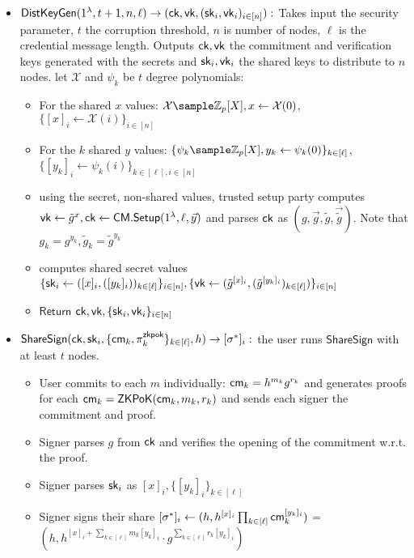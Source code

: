 \begin{itemize}
    \item $\mathsf{DistKeyGen}(1^{\lambda}, t+1, n, \ell) \to (\mathsf{ck}, \mathsf{vk}, (\mathsf{sk}_i, \mathsf{vk}_i)_{i \in [n]}):$ Takes input the security parameter, $t$ the corruption threshold, $n$ is number of nodes, $\ell$ is the credential message length. Outputs $\mathsf{ck}, \mathsf{vk}$ the commitment and verification keys generated with the secrets and $\mathsf{sk}_i, \mathsf{vk}_i$ the shared keys to distribute to $n$ nodes. let $\mathcal{X}$ and $\psi_k $ be $t$ degree polynomials:
    \begin{itemize}
        \item For the shared $x$ values: $\mathcal{X} \sample \Z_p[X], x \gets \mathcal{X}(0)$, $\{[x]_i \gets \mathcal{X}(i)\}_{i\in [n]}$
        \item For the $k$ shared $y$ values: $\{\psi_k \sample \Z_p[X], y_k \gets \psi_k(0)\}_{k \in [\ell]}$, $\{[y_k]_i \gets \psi_k(i)\}_{k \in [\ell], i \in [n]}$
        \item using the secret, non-shared values, trusted setup party computes $\mathsf{vk} \gets \tilde{g}^x, \mathsf{ck} \gets \mathsf{CM.Setup}(1^{\lambda}, \ell, \vec{y})$ and parses $\mathsf{ck}$ as $(g, \vec{g}, \tilde{g}, \vec{\tilde{g}})$. Note that $g_k = g^{y_k}, \tilde{g}_k = \tilde{g}^{y_k}$
        \item computes shared secret values $\{\mathsf{sk}_i \gets ([x]_i, ([y_k]_i))_{k\in[\ell]}\}_{i \in [n]}, \{\mathsf{vk} \gets (\tilde{g}^{[x]_i}, (\tilde{g}^{[y_k]_i})_{k\in[\ell]})\}_{i \in [n]}$
        \item $\mathsf{Return } $ $ \mathsf{ck}, \mathsf{vk}, \{\mathsf{sk}_i, \mathsf{vk}_i\}_{i \in [n]}$
    \end{itemize}
        

    \item $\mathsf{ShareSign}(\mathsf{ck}, \mathsf{sk}_i, \{\mathsf{cm}_k, \pi_k^{\mathsf{zkpok}}\}_{k \in [\ell]}, h) \to [\sigma^*]_i:$ the user runs $\mathsf{ShareSign}$ with at least $t$ nodes. 
    \begin{itemize}
        \item User commits to each $m$ individually: $\mathsf{cm}_k = h^{m_k}g^{r_k}$ and generates proofs for each $\mathsf{cm}_k = {\mathsf{ZKPoK}}(\mathsf{cm}_k, m_k, r_k)$ and sends each signer the commitment and proof.
        \item Signer parses $g$ from $\mathsf{ck}$ and verifies the opening of the commitment w.r.t. the proof.
        \item Signer parses $\mathsf{sk}_i$ as $[x]_i, \{[y_k]_i\}_{k \in [\ell]}$
        \item Signer signs their share $[\sigma^*]_i \gets (h, h^{[x]_i} \prod_{k \in [\ell]} \mathsf{cm}_k^{[y_k]_i} )$ = $(h, h^{[x]_i + \sum_{k \in [\ell]} m_k[y_k]_i} \cdot g^{\sum_{k \in [\ell]} r_k [y_k]_i})$
    \end{itemize}



\end{itemize}
